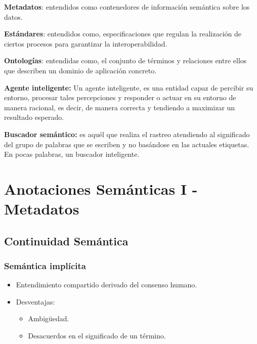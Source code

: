 \documentclass[a4paper,12pt,twoside,final,spanish]{article}
\begin{document}
\textbf{Metadatos}: entendidos como contenedores de información semántica sobre los datos.

\textbf{Estándares}: entendidos como, especificaciones que regulan la realización de ciertos procesos para garantizar la interoperabilidad.

\textbf{Ontologías}: entendidas como, el conjunto de términos y relaciones entre ellos que describen un dominio de aplicación concreto.

\textbf{Agente inteligente:} Un agente inteligente, es una entidad capaz de percibir su entorno, procesar tales percepciones y responder o actuar en su entorno de manera racional, es decir, de manera correcta y tendiendo a maximizar un resultado esperado.

\textbf{Buscador semántico:}  es aquél que realiza el rastreo atendiendo al significado del grupo de palabras que se escriben y no basándose en las actuales etiquetas.
En pocas palabras, un buscador inteligente.

\section{Anotaciones Semánticas I - Metadatos}

\subsection{Continuidad Semántica}

\subsubsection{Semántica implícita}
	\begin{itemize}
	\item Entendimiento compartido derivado del consenso humano.
	\item Desventajas:
		\begin{itemize}
		\item Ambigüedad.
		\item Desacuerdos en el significado de un término.
		\end{itemize}
	\end{itemize}
	
\end{document}
